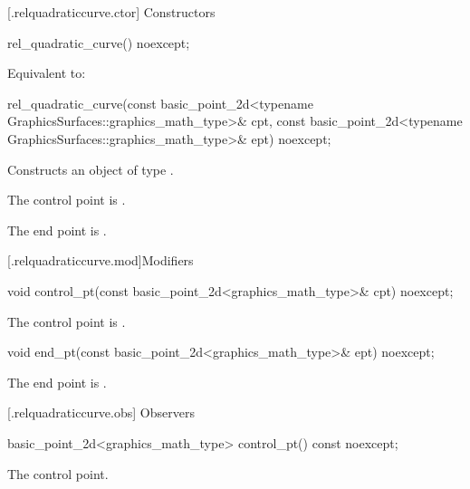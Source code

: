  [\iotwod.relquadraticcurve.ctor] {Constructors}%

%
\begin{itemdecl}
rel_quadratic_curve() noexcept;
\end{itemdecl}
\begin{itemdescr}
\pnum
\effects Equivalent to: 
\end{itemdescr}

%
\begin{itemdecl}
rel_quadratic_curve(const basic_point_2d<typename GraphicsSurfaces::graphics_math_type>& cpt,
  const basic_point_2d<typename GraphicsSurfaces::graphics_math_type>& ept) noexcept;
\end{itemdecl}
\begin{itemdescr}
\pnum
\effects Constructs an object of type .

\pnum
\remarks The control point is .

\pnum
\remarks The end point is .
\end{itemdescr}

 [\iotwod.relquadraticcurve.mod]{Modifiers}%

%
\begin{itemdecl}
void control_pt(const basic_point_2d<graphics_math_type>& cpt) noexcept;
\end{itemdecl}
\begin{itemdescr}
\pnum
\effects The control point is .
\end{itemdescr}

%
\begin{itemdecl}
void end_pt(const basic_point_2d<graphics_math_type>& ept) noexcept;
\end{itemdecl}
\begin{itemdescr}
\pnum
\effects The end point is .
\end{itemdescr}

 [\iotwod.relquadraticcurve.obs] {Observers}

%
\begin{itemdecl}
basic_point_2d<graphics_math_type> control_pt() const noexcept;
\end{itemdecl}
\begin{itemdescr}
\pnum
\returns The control point.
\end{itemdescr}

